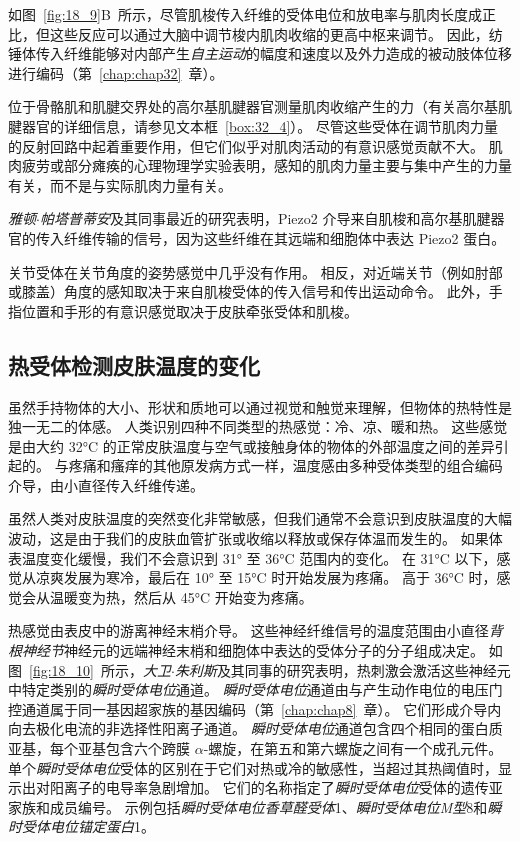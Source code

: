 如图~\ref{fig:18_9}B~所示，尽管肌梭传入纤维的受体电位和放电率与肌肉长度成正比，但这些反应可以通过大脑中调节梭内肌肉收缩的更高中枢来调节。
因此，纺锤体传入纤维能够对内部产生\textit{自主运动}的幅度和速度以及外力造成的被动肢体位移进行编码（第~\ref{chap:chap32}~章）。


位于骨骼肌和肌腱交界处的高尔基肌腱器官测量肌肉收缩产生的力（有关高尔基肌腱器官的详细信息，请参见文本框~\ref{box:32_4}）。
尽管这些受体在调节肌肉力量的反射回路中起着重要作用，但它们似乎对肌肉活动的有意识感觉贡献不大。
肌肉疲劳或部分瘫痪的心理物理学实验表明，感知的肌肉力量主要与集中产生的力量有关，而不是与实际肌肉力量有关。


\textit{雅顿$\cdot$帕塔普蒂安}及其同事最近的研究表明，Piezo2 介导来自肌梭和高尔基肌腱器官的传入纤维传输的信号，因为这些纤维在其远端和细胞体中表达 Piezo2 蛋白。


关节受体在关节角度的姿势感觉中几乎没有作用。
相反，对近端关节（例如肘部或膝盖）角度的感知取决于来自肌梭受体的传入信号和传出运动命令。
此外，手指位置和手形的有意识感觉取决于皮肤牵张受体和肌梭。



\subsection{热受体检测皮肤温度的变化}

虽然手持物体的大小、形状和质地可以通过视觉和触觉来理解，但物体的热特性是独一无二的体感。
人类识别四种不同类型的热感觉：冷、凉、暖和热。
这些感觉是由大约 32°C 的正常皮肤温度与空气或接触身体的物体的外部温度之间的差异引起的。
与疼痛和瘙痒的其他原发病方式一样，温度感由多种受体类型的组合编码介导，由小直径传入纤维传递。


虽然人类对皮肤温度的突然变化非常敏感，但我们通常不会意识到皮肤温度的大幅波动，这是由于我们的皮肤血管扩张或收缩以释放或保存体温而发生的。
如果体表温度变化缓慢，我们不会意识到 31° 至 36°C 范围内的变化。
在 31°C 以下，感觉从凉爽发展为寒冷，最后在 10° 至 15°C 时开始发展为疼痛。
高于 36°C 时，感觉会从温暖变为热，然后从 45°C 开始变为疼痛。


热感觉由表皮中的游离神经末梢介导。
这些神经纤维信号的温度范围由小直径\textit{背根神经节}神经元的远端神经末梢和细胞体中表达的受体分子的分子组成决定。
如图~\ref{fig:18_10}~所示，\textit{大卫$\cdot$朱利斯}及其同事的研究表明，热刺激会激活这些神经元中特定类别的\textit{瞬时受体电位}通道。
\textit{瞬时受体电位}通道由与产生动作电位的电压门控通道属于同一基因超家族的基因编码（第~\ref{chap:chap8}~章）。 
它们形成介导内向去极化电流的非选择性阳离子通道。
\textit{瞬时受体电位}通道包含四个相同的蛋白质亚基，每个亚基包含六个跨膜 $\alpha$-螺旋，在第五和第六螺旋之间有一个成孔元件。
单个\textit{瞬时受体电位}受体的区别在于它们对热或冷的敏感性，当超过其热阈值时，显示出对阳离子的电导率急剧增加。
它们的名称指定了\textit{瞬时受体电位}受体的遗传亚家族和成员编号。 
示例包括\textit{瞬时受体电位香草醛受体}1、\textit{瞬时受体电位M型}8和\textit{瞬时受体电位锚定蛋白}1。



